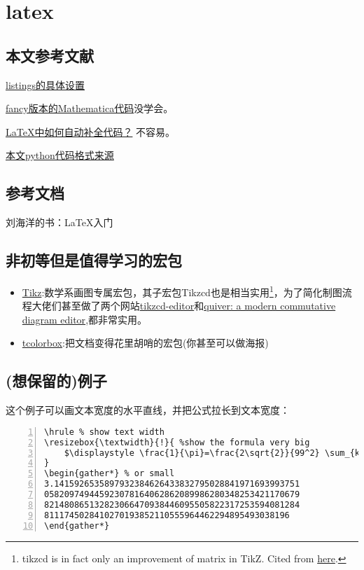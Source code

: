 \documentclass[11pt]{amsart}
\begin{document}
\section{latex} 

\subsection{本文参考文献}

 \href{http://blog.sina.com.cn/s/blog_a382a9080102z25i.html}{listings的具体设置}
  
   \href{https://tex.stackexchange.com/questions/84748/fanciest-way-to-include-mathematica-code-in-latex}{fancy版本的Mathematica代码}没学会。
           
\href{https://tex.stackexchange.com/questions/126241/autoindent-in-texmaker}{\LaTeX 中如何自动补全代码？} 不容易。

\href{https://tex.stackexchange.com/questions/235783/listings-recognize-numbers-and-1e-3}{本文python代码格式来源}
\subsection{参考文档}
刘海洋的书：\LaTeX 入门
\subsection{非初等但是值得学习的宏包}
\begin{itemize}
\item \href{https://ctan.org/pkg/pgf}{Tikz}:数学系画图专属宏包，其子宏包Tikzcd也是相当实用\footnote{tikzcd is in fact only an improvement of matrix in TikZ. Cited from \href{https://tex.stackexchange.com/questions/484743/format-single-node-in-tikzcd}{here}.}，为了简化制图流程大佬们甚至做了两个网站\href{https://tikzcd.yichuanshen.de/}{tikzcd-editor}和\href{https://q.uiver.app/}{quiver: a modern commutative diagram editor},都非常实用。 
\item \href{https://ctan.org/pkg/tcolorbox}{tcolorbox}:把文档变得花里胡哨的宏包(你甚至可以做海报)
\end{itemize}
\subsection{(想保留的)例子}
这个例子可以画文本宽度的水平直线，并把公式拉长到文本宽度：
\begin{lstlisting}[numbers=left,numberstyle=\tiny,numbersep=10pt]
\hrule % show text width
\resizebox{\textwidth}{!}{ %show the formula very big
	$\displaystyle \frac{1}{\pi}=\frac{2\sqrt{2}}{99^2} \sum_{k=0}^{\infty} \frac{(4k)!}{k!^4}\frac{26390k+1103}{396^{4k}} $
}
\begin{gather*} % or small
3.1415926535897932384626433832795028841971693993751
058209749445923078164062862089986280348253421170679
821480865132823066470938446095505822317253594081284
8111745028410270193852110555964462294895493038196
\end{gather*}
\end{lstlisting}
\end{document}
